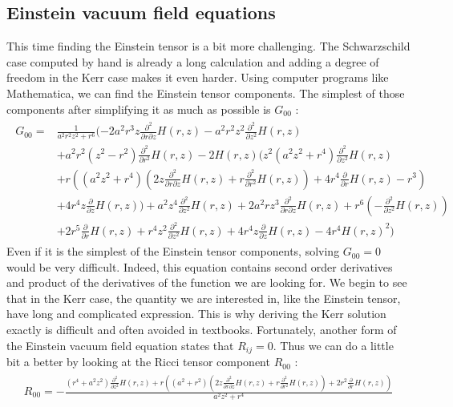 \documentclass[a4paper,12pt]{article}
\theoremstyle{definition}
\begin{document}
\subsection{Einstein vacuum field equations}
This time finding the Einstein tensor is a bit more challenging.
The Schwarzschild case computed by hand is already a long calculation and adding a degree of freedom in the Kerr case makes it even harder.
Using computer programs like Mathematica, we can find the Einstein tensor components.
The simplest of those components after simplifying it as much as possible is $G_{00}$ :
\begin{align}
\begin{split}
	G_{00} = &\frac{1}{a^2 r^2z^2+r^6}(-2 a^2 r^3 z \frac{\partial^2}{\partial r\partial z}H(r,z)-a^2 r^2 z^2 \frac{\partial^2}{\partial z^2}H(r,z)\\&+a^2 r^2(z^2-r^2) \frac{\partial^2}{\partial r^2}H(r,z)
	-2 H(r,z) (z^2 (a^2z^2+r^4) \frac{\partial^2}{\partial z^2}H(r,z)\\&+r ((a^2 z^2+r^4)(2 z \frac{\partial^2}{\partial r\partial z}H(r,z)+r \frac{\partial^2}{\partial r^2}H(r,z))
	+4r^4\frac{\partial}{\partial r}H(r,z)-r^3)\\&+4 r^4 z \frac{\partial}{\partial z}H(r,z))+a^2 z^4\frac{\partial^2}{\partial z^2}H(r,z)+2 a^2 r z^3 \frac{\partial^2}{\partial r\partial z}H(r,z)
	+r^6(-\frac{\partial^2}{\partial z^2}H(r,z))\\&+2 r^5 \frac{\partial}{\partial r}H(r,z)+r^4 z^2\frac{\partial^2}{\partial z^2}H(r,z)+4 r^4 z \frac{\partial}{\partial z}H(r,z)-4 r^4 H(r,z)^2)
\end{split}
\end{align}
Even if it is the simplest of the Einstein tensor components, solving $G_{00}=0$ would be very difficult.
Indeed, this equation contains second order derivatives and product of the derivatives of the function we are looking for.
We begin to see that in the Kerr case, the quantity we are interested in, like the Einstein tensor, have long and complicated expression.
This is why deriving the Kerr solution exactly is difficult and often avoided in textbooks.
Fortunately, another form of the Einstein vacuum field equation states that $R_{ij}=0$.
Thus we can do a little bit a better by looking at the Ricci tensor component $R_{00}$ :
\begin{align}
\begin{split}
	R_{00}=-\frac{(r^4+a^2z^2)\frac{\partial^2}{\partial z^2}H(r,z)+r
	((a^2+r^2) (2 z \frac{\partial^2}{\partial r\partial z}H(r,z)+r
	\frac{\partial^2}{\partial r^2}H(r,z))+2 r^2 \frac{\partial}{\partial r}H(r,z))}{a^2 z^2+r^4}
\end{split}
\end{align}
\end{document}
